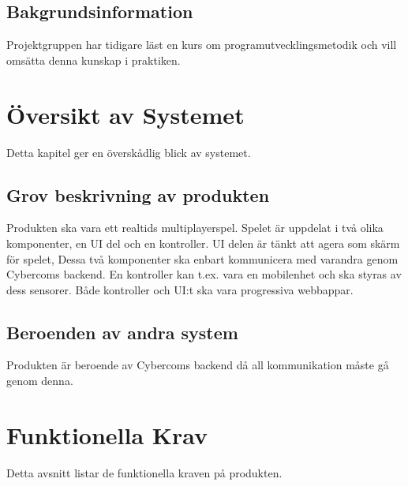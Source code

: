 \documentclass[10pt]{article}
\begin{document}
	\subsection{Bakgrundsinformation}
		Projektgruppen har tidigare läst en kurs om programutvecklingsmetodik och vill omsätta denna kunskap i praktiken. 
		
\pagebreak
\section{Översikt av Systemet}
	Detta kapitel ger en överskådlig blick av systemet.

	\subsection{Grov beskrivning av produkten}
	Produkten ska vara ett realtids multiplayerspel. Spelet är uppdelat i två olika komponenter, en UI del och en kontroller. UI delen är tänkt att agera som skärm för spelet,  Dessa två komponenter ska enbart kommunicera med varandra genom Cybercoms backend. En kontroller kan t.ex. vara en mobilenhet och ska styras av dess sensorer. Både kontroller och UI:t ska vara progressiva webbappar. 
	
	
	\subsection{Beroenden av andra system}
	Produkten är beroende av Cybercoms backend då all kommunikation måste gå genom denna. 

\pagebreak
\section{Funktionella Krav}
	Detta avsnitt listar de funktionella kraven på produkten.	
	
\end{document}
